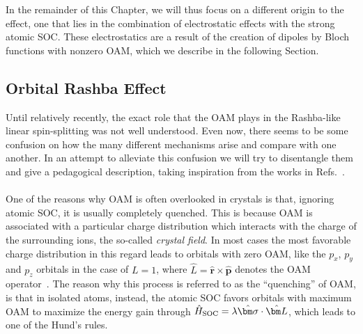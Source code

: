 In the remainder of this Chapter, we will thus focus on a different origin to the effect, one that lies in the combination of electrostatic effects with the strong atomic SOC.
These electrostatics are a result of the creation of dipoles by Bloch functions with nonzero OAM, which we describe in the following Section. 
\subsection{Orbital Rashba Effect}
Until relatively recently, the exact role that the OAM plays in the Rashba-like linear spin-splitting was not well understood. Even now, there seems to be some confusion on how the many different mechanisms arise and compare with one another.   
In an attempt to alleviate this confusion we will try to disentangle them and give a pedagogical description, taking inspiration from the works in Refs.~\cite{Petersen2000,Park2011,Park2012,Kim2014,Park2015,Go2016}.
\\\\
One of the reasons why OAM is often overlooked in crystals is that, ignoring atomic SOC, it is usually completely quenched.
This is because OAM is associated with a particular charge distribution which interacts with the charge of the surrounding ions, the so-called {\it crystal field}.
In most cases the most favorable charge distribution in this regard leads to orbitals with zero OAM, like the $p_x$, $p_y$ and $p_z$ orbitals in the case of $L=1$, where $\hat{L} = \hat{\bm r} \times \hat{\bm p}$ denotes the OAM operator~\cite{Ballhausen}.
The reason why this process is referred to as the ``quenching'' of OAM, is that in isolated atoms, instead, the atomic SOC favors orbitals with maximum OAM to maximize the energy gain through $\hat{H}_{\rm SOC} = \lambda \hat{\bm \sigma} \cdot \hat{\bm L}$, which leads to one of the Hund's rules.
